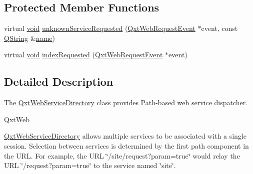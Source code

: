 \subsection*{Protected Member Functions}
\begin{DoxyCompactItemize}
\item 
virtual \hyperlink{group___u_a_v_objects_plugin_ga444cf2ff3f0ecbe028adce838d373f5c}{void} \hyperlink{class_qxt_web_service_directory_a0b0bd30adcb4664978bcc2f95f38ebf2}{unknown\-Service\-Requested} (\hyperlink{class_qxt_web_request_event}{Qxt\-Web\-Request\-Event} $\ast$event, const \hyperlink{group___u_a_v_objects_plugin_gab9d252f49c333c94a72f97ce3105a32d}{Q\-String} \&\hyperlink{glext_8h_ad977737dfc9a274a62741b9500c49a32}{name})
\item 
virtual \hyperlink{group___u_a_v_objects_plugin_ga444cf2ff3f0ecbe028adce838d373f5c}{void} \hyperlink{class_qxt_web_service_directory_aeae51d5b5607ba5a4db37c97567f10ff}{index\-Requested} (\hyperlink{class_qxt_web_request_event}{Qxt\-Web\-Request\-Event} $\ast$event)
\end{DoxyCompactItemize}


\subsection{Detailed Description}
The \hyperlink{class_qxt_web_service_directory}{Qxt\-Web\-Service\-Directory} class provides Path-\/based web service dispatcher. 

Qxt\-Web

\hyperlink{class_qxt_web_service_directory}{Qxt\-Web\-Service\-Directory} allows multiple services to be associated with a single session. Selection between services is determined by the first path component in the U\-R\-L. For example, the U\-R\-L \char`\"{}/site/request?param=true\char`\"{} would relay the U\-R\-L \char`\"{}/request?param=true\char`\"{} to the service named \char`\"{}site\char`\"{}.

